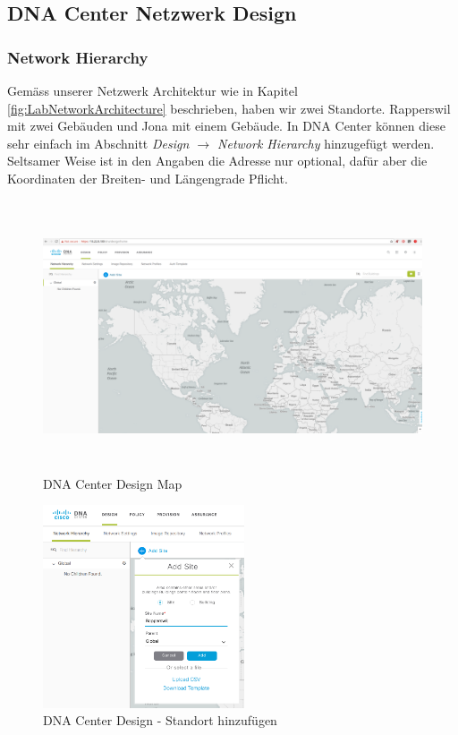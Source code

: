 \subsection{DNA Center Netzwerk Design}

\subsubsection{Network Hierarchy}

Gemäss unserer Netzwerk Architektur wie in Kapitel \ref{fig:LabNetworkArchitecture} beschrieben, haben wir zwei Standorte. Rapperswil mit zwei Gebäuden und Jona mit einem Gebäude.
In DNA Center können diese sehr einfach im Abschnitt \textit{Design $\rightarrow$ Network Hierarchy} hinzugefügt werden. Seltsamer Weise ist in den Angaben die Adresse nur optional, dafür aber die Koordinaten der Breiten- und Längengrade Pflicht.

\begin{figure}[H]
	\centering
	\includegraphics[height=8cm]{img/Selection_011.png}
	\caption{DNA Center Design Map}
	\label{fig:dna-center-design-1}
\end{figure}

\begin{figure}[H]
	\centering
	\includegraphics[height=6cm]{img/Selection_012.png}
	\caption{DNA Center Design - Standort hinzufügen}
	\label{fig:dna-center-design-2}
\end{figure}

